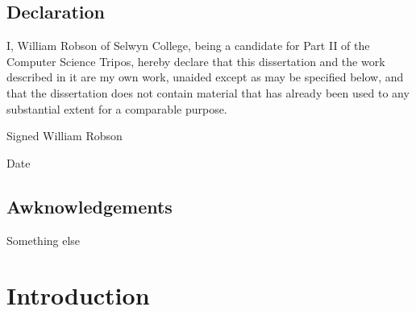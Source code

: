 \section*{Declaration}

I, William Robson of Selwyn College, being a candidate for Part II of the Computer Science Tripos, hereby declare that this dissertation and the work described in it are my own work, unaided except as may be specified below, and that the dissertation does not contain material that has already been used to any substantial extent for a comparable purpose. 

\vspace{1cm}

Signed William Robson

Date \thedate 

\cleardoublepage

\tableofcontents
\listoffigures

\newpage

\section*{Awknowledgements}

Something else

\cleardoublepage
\setcounter{page}{1}

\chapter{Introduction}